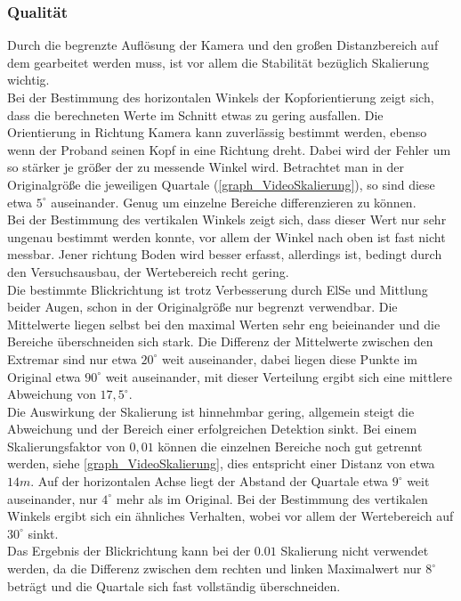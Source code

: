 \subsubsection{Qualität}
Durch die begrenzte Auflösung der Kamera und den großen Distanzbereich auf dem gearbeitet werden muss, ist vor allem die Stabilität bezüglich Skalierung wichtig.\\
Bei der Bestimmung des horizontalen Winkels der Kopforientierung zeigt sich, dass die berechneten Werte im Schnitt etwas zu gering ausfallen. Die Orientierung in Richtung Kamera kann zuverlässig bestimmt werden, ebenso wenn der Proband seinen Kopf in eine Richtung dreht. Dabei wird der Fehler um so stärker je größer der zu messende Winkel wird. Betrachtet man in der Originalgröße die jeweiligen Quartale (\autoref{graph_VideoSkalierung}), so sind diese etwa $5^\circ$ auseinander. Genug um einzelne Bereiche differenzieren zu können.\\
Bei der Bestimmung des vertikalen Winkels zeigt sich, dass dieser Wert nur sehr ungenau bestimmt werden konnte, vor allem der Winkel nach oben ist fast nicht messbar. Jener richtung Boden wird besser erfasst, allerdings ist, bedingt durch den Versuchsausbau, der Wertebereich recht gering.\\
Die bestimmte Blickrichtung ist trotz Verbesserung durch ElSe und Mittlung beider Augen, schon in der Originalgröße nur begrenzt verwendbar. Die Mittelwerte liegen selbst bei den maximal Werten sehr eng beieinander und die Bereiche überschneiden sich stark. Die Differenz der Mittelwerte zwischen den Extremar sind nur etwa $20^\circ$ weit auseinander, dabei liegen diese Punkte im Original etwa $90^\circ$ weit auseinander, mit dieser Verteilung ergibt sich eine mittlere Abweichung von $17,5^\circ$. \\
Die Auswirkung der Skalierung ist hinnehmbar gering, allgemein steigt die Abweichung und der Bereich einer erfolgreichen Detektion sinkt. Bei einem Skalierungsfaktor von $0,01$ können die einzelnen Bereiche noch gut getrennt werden, siehe \autoref{graph_VideoSkalierung}, dies entspricht einer Distanz von etwa $14m$. Auf der horizontalen Achse liegt der Abstand der Quartale etwa $9^\circ$ weit auseinander, nur $4^\circ$ mehr als im Original. Bei der Bestimmung des vertikalen Winkels ergibt sich ein ähnliches Verhalten, wobei vor allem der Wertebereich auf $30^\circ$ sinkt.\\
Das Ergebnis der Blickrichtung kann bei der $0.01$ Skalierung nicht verwendet werden, da die Differenz zwischen dem rechten und linken Maximalwert nur $8^\circ$ beträgt und die Quartale sich fast vollständig überschneiden.\\
